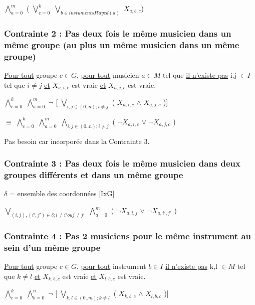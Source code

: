 \documentclass[a4paper,10pt]{article}
\begin{document}
$\bigwedge \limits_{a=0}^{m}$ ( $\bigvee \limits_{c=0}^{k}$ $\bigvee \limits_{b \in instumentsPlayed(a) }$  $X_{a,b,c}$)



\subsubsection{Contrainte 2 : Pas deux fois le même musicien dans un même groupe (au plus un même musicien dans un même groupe)}


\underline{Pour tout} groupe $c \in G$, \underline{pour tout} musicien $a \in M $ tel que \underline{il n'existe pas} i,j $\in I$  tel que $i \neq j$ \underline{et} $X_{a,i,c}$ est vraie
\underline{et} $X_{a,j,c}$ est vraie.


$\bigwedge \limits_{c=0}^{k}$ $\bigwedge \limits_{a=0}^{m}$ $\neg$ [ $\bigvee \limits_{i,j \in (0..n); i\neq j}$ ( $X_{a,i,c}$ $\wedge$ $X_{a,j,c}$ )]


$\equiv$ $\bigwedge \limits_{c=0}^{k}$ $\bigwedge \limits_{a=0}^{m}$  $\bigwedge \limits_{i,j \in (0..n); i\neq j}$ ( $\neg X_{a,i,c}$ $\vee $ $ \neg X_{a,j,c}$ )


Pas besoin car incorporée dans la Contrainte 3.

\subsubsection{Contrainte 3 : Pas deux fois le même musicien dans deux groupes différents et dans un même groupe}

$\delta$ = ensemble des coordonnées [IxG]

 $\bigvee \limits_{(i,j), (i',j') \in \delta ; i\neq i' ou j\neq j'}$ $\bigwedge \limits_{a=0}^{m}$ ( $\neg X_{a,i,j}$ $\vee $ $ \neg X_{a,i',j'}$ )

\subsubsection{Contrainte 4 : Pas 2 musiciens pour le même instrument au sein d'un même groupe}
 
\underline{Pour tout} groupe $c \in G$, \underline{pour tout} instrument $b \in I$ \underline{il n'existe pas} k,l $\in M$  tel que $k \neq l$ \underline{et} $X_{k,b,c}$ est vraie
\underline{et} $X_{l,b,c}$ est vraie. 
 
$\bigwedge \limits_{c=0}^{k}$ $\bigwedge \limits_{b=0}^{n}$ $\neg$ [ $\bigvee \limits_{k,l \in (0..m); k\neq l}$ ( $X_{k,b,c}$ $\wedge$ $X_{l,b,c}$ )]
\end{document}
